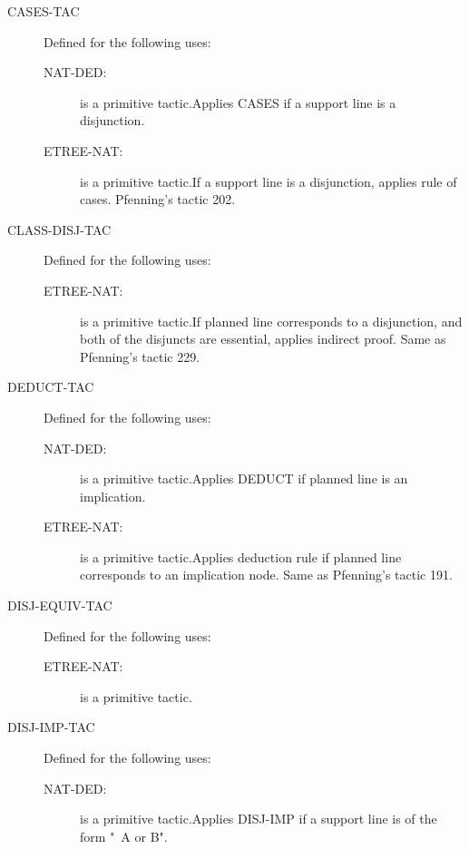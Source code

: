\begin{description}
\begin{description}
\end{description}

\item[CASES-TAC]  Defined for the following uses:
\begin{description}
\item[NAT-DED:]  is a primitive tactic.Applies CASES if a support line is a disjunction.

\item[ETREE-NAT:]  is a primitive tactic.If a support line is a disjunction, applies rule of cases. 
Pfenning's tactic 202.

\end{description}

\item[CLASS-DISJ-TAC]  Defined for the following uses:
\begin{description}
\item[ETREE-NAT:]  is a primitive tactic.If planned line corresponds to a disjunction, and both of the disjuncts
are essential, applies indirect proof.  Same as Pfenning's tactic 229.

\end{description}

\item[DEDUCT-TAC]  Defined for the following uses:
\begin{description}
\item[NAT-DED:]  is a primitive tactic.Applies DEDUCT if planned line is an implication.

\item[ETREE-NAT:]  is a primitive tactic.Applies deduction rule if planned line corresponds to an implication node.
Same as Pfenning's tactic 191.

\end{description}

\item[DISJ-EQUIV-TAC]  Defined for the following uses:
\begin{description}
\item[ETREE-NAT:]  is a primitive tactic.

\end{description}

\item[DISJ-IMP-TAC]  Defined for the following uses:
\begin{description}
\item[NAT-DED:]  is a primitive tactic.Applies DISJ-IMP if a support line is of the form "~A or B".


\end{description}
\end{description}
